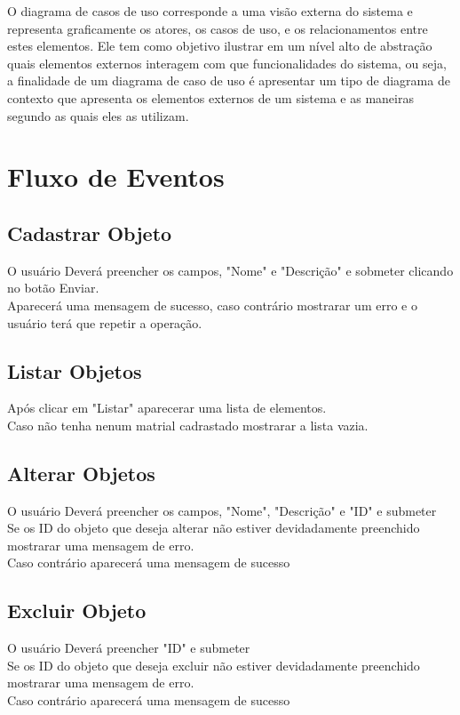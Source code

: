 \documentclass[a4paper]{article}
\begin{document}
      O diagrama de casos de uso corresponde a uma visão externa do sistema
      e representa graficamente os atores, os casos de uso, e os relacionamentos
      entre estes elementos. Ele tem como objetivo ilustrar em um nível alto de
      abstração quais elementos externos interagem com que funcionalidades do sistema,
      ou seja, a finalidade de um diagrama de caso de uso é apresentar um tipo de diagrama
      de contexto que apresenta os elementos externos de um sistema e as maneiras segundo
      as quais eles as utilizam.

 \section{Fluxo de Eventos}
    \subsection{Cadastrar Objeto}
      O usuário Deverá preencher os campos, "Nome" e "Descrição" e sobmeter clicando no botão Enviar.\\
      Aparecerá uma mensagem de sucesso, caso contrário mostrarar um erro e o usuário terá que repetir a operação.\\

    \subsection{Listar Objetos}
    Após clicar em "Listar" aparecerar uma lista de elementos.\\
    Caso não tenha nenum matrial cadrastado mostrarar a lista vazia.\\
    
    \subsection{Alterar Objetos}
    O usuário Deverá preencher os campos, "Nome", "Descrição" e "ID" e submeter\\
    Se os ID do objeto que deseja alterar não estiver devidadamente preenchido mostrarar uma mensagem de erro.\\
    Caso contrário aparecerá uma mensagem de sucesso\\

    \subsection{Excluir Objeto}
    O usuário Deverá preencher "ID" e submeter\\
    Se os ID do objeto que deseja excluir não estiver devidadamente preenchido mostrarar uma mensagem de erro.\\
    Caso contrário aparecerá uma mensagem de sucesso\\
  
\end{document}
